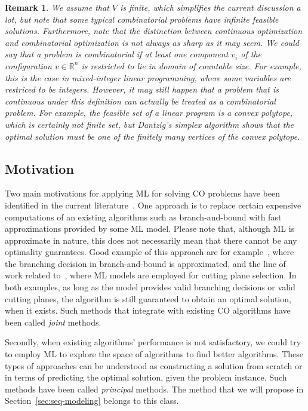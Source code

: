 \documentclass[a4paper]{report}
\theoremstyle{definition}
\theoremstyle{plain}
\newtheorem{remark}{Remark}[chapter]
\begin{document}
\begin{remark}
We assume that $V$ is finite, which simplifies the current discussion a lot, but note that some typical combinatorial problems have infinite feasible solutions.
%
Furthermore, note that the distinction between \emph{continuous} optimization and \emph{combinatorial}
optimization is not always as sharp as it may seem.
%
We could say that a problem is combinatorial if at least one component $v_i$ of
the configuration $v \in \mathbb{R}^n$ is restricted to lie in domain of countable size.
%
For example, this is the case in mixed-integer linear programming, where some
variables are restriced to be integers.
%
However, it may still happen that a problem that is continuous under this
definition can actually be treated as a combinatorial problem. For example, the
feasible set of a linear program is a convex polytope, which is certainly not
finite set, but Dantzig's simplex algorithm shows that the optimal solution must
be one of the finitely many vertices of the convex polytope.
\end{remark}

\subsection{Motivation}

Two main motivations for applying ML for solving CO problems have been
identified in the current
literature~\cite{bengioMachineLearningCombinatorial2020}.
%
One approach is to replace certain expensive computations of an existing
algorithms such as branch-and-bound with fast approximations provided by some ML
model.
%
Please note that, although ML is approximate in nature, this does not necessarily
mean that there cannot be any optimality guarantees.
%
Good example of this approach are for
example~\cite{gasseExactCombinatorialOptimization2019}, where the branching
decision in branch-and-bound is approximated, and the line of work related
to~\cite{tangReinforcementLearningInteger2020}, where ML models are employed for
cutting plane selection.
%
In both examples, as long as the model provides valid branching decisions or valid
cutting planes, the algorithm is still guaranteed to obtain an optimal solution,
when it exists.
%
Such methods that integrate with existing CO algorithms have been called
\emph{joint} methods.

Secondly, when existing algorithms' performance is not satisfactory, we could
try to employ ML to explore the space of algorithms to find better algorithms.
%
These types of approaches can be understood as constructing a solution from
scratch or in terms of predicting the optimal solution, given the problem
instance. Such methods have been called \emph{principal} methods.
%
The method that we will propose in Section~\ref{sec:seq-modeling} belongs to
this class.
\end{document}
